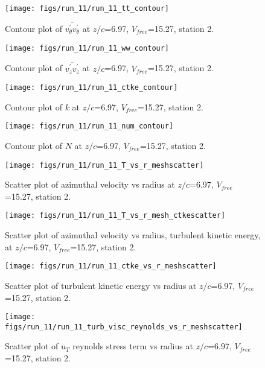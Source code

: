 \begin{figure}[H]
\centering
\texttt{[image: figs/run\_11/run\_11\_tt\_contour]}
\caption{Contour plot of $\overline{v_{\theta}^{\prime} v_{\theta}^{\prime}}$ at $z/c$=6.97, $V_{free}$=15.27, station 2.}
\end{figure}


\begin{figure}[H]
\centering
\texttt{[image: figs/run\_11/run\_11\_ww\_contour]}
\caption{Contour plot of $\overline{v_{z}^{\prime} v_{z}^{\prime}}$ at $z/c$=6.97, $V_{free}$=15.27, station 2.}
\end{figure}


\begin{figure}[H]
\centering
\texttt{[image: figs/run\_11/run\_11\_ctke\_contour]}
\caption{Contour plot of $k$ at $z/c$=6.97, $V_{free}$=15.27, station 2.}
\end{figure}


\begin{figure}[H]
\centering
\texttt{[image: figs/run\_11/run\_11\_num\_contour]}
\caption{Contour plot of $N$ at $z/c$=6.97, $V_{free}$=15.27, station 2.}
\end{figure}


\begin{figure}[H]
\centering
\texttt{[image: figs/run\_11/run\_11\_T\_vs\_r\_meshscatter]}
\caption{Scatter plot of azimuthal velocity vs radius at $z/c$=6.97, $V_{free}$=15.27, station 2.}
\end{figure}


\begin{figure}[H]
\centering
\texttt{[image: figs/run\_11/run\_11\_T\_vs\_r\_mesh\_ctkescatter]}
\caption{Scatter plot of azimuthal velocity vs radius, turbulent kinetic energy, at $z/c$=6.97, $V_{free}$=15.27, station 2.}
\end{figure}


\begin{figure}[H]
\centering
\texttt{[image: figs/run\_11/run\_11\_ctke\_vs\_r\_meshscatter]}
\caption{Scatter plot of turbulent kinetic energy vs radius at $z/c$=6.97, $V_{free}$=15.27, station 2.}
\end{figure}


\begin{figure}[H]
\centering
\texttt{[image: figs/run\_11/run\_11\_turb\_visc\_reynolds\_vs\_r\_meshscatter]}
\caption{Scatter plot of $
u_T$ reynolds stress term vs radius at $z/c$=6.97, $V_{free}$=15.27, station 2.}
\end{figure}


